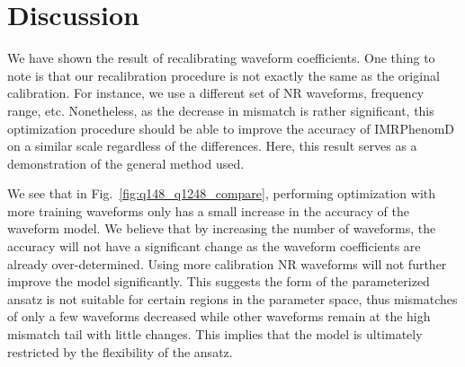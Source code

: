 \documentclass[twocolumn]{aastex631}
\begin{document}
\section{Discussion} \label{sec:discussion}


We have shown the result of recalibrating waveform coefficients. One thing to note is that our recalibration procedure is not exactly the same as the original calibration. For instance, we use a different set of NR waveforms, frequency range, etc. Nonetheless, as the decrease in mismatch is rather significant, this optimization procedure should be able to improve the accuracy of IMRPhenomD on a similar scale regardless of the differences. Here, this result serves as a demonstration of the general method used.  

We see that in Fig.~\ref{fig:q148_q1248_compare}, performing optimization with more training waveforms only has a small increase in the accuracy of the waveform model. We believe that by increasing the number of waveforms, the accuracy will not have a significant change as the waveform coefficients are already over-determined. Using more calibration NR waveforms will not further improve the model significantly. This suggests the form of the parameterized ansatz is not suitable for certain regions in the parameter space, thus mismatches of only a few waveforms decreased while other waveforms remain at the high mismatch tail with little changes. This implies that the model is ultimately restricted by the flexibility of the ansatz. 
\end{document}
